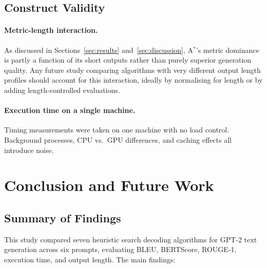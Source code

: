 \documentclass[12pt]{article}
\begin{document}
	\subsection{Construct Validity}
	
	\paragraph{Metric-length interaction.}
	As discussed in Sections~\ref{sec:results} and~\ref{sec:discussion}, A$^*$'s metric dominance is partly a function of its short outputs rather than purely superior generation quality. Any future study comparing algorithms with very different output length profiles should account for this interaction, ideally by normalising for length or by adding length-controlled evaluations.
	
	\paragraph{Execution time on a single machine.}
	Timing measurements were taken on one machine with no load control. Background processes, CPU vs.\ GPU differences, and caching effects all introduce noise.
	
	\section{Conclusion and Future Work}
	\label{sec:conclusion}
	
	\subsection{Summary of Findings}
	
	This study compared seven heuristic search decoding algorithms for GPT-2 text generation across six prompts, evaluating BLEU, BERTScore, ROUGE-1, execution time, and output length. The main findings:
	
\end{document}
